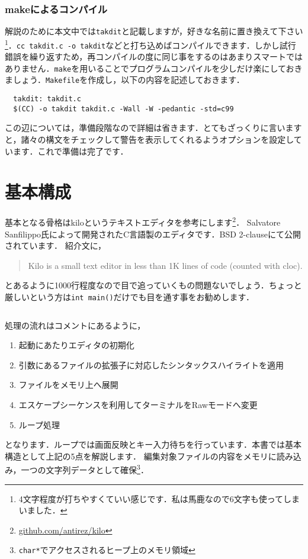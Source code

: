 \subsubsection{makeによるコンパイル}
解説のために本文中では\texttt{takdit}と記載しますが，好きな名前に置き換えて下さい\footnote{4文字程度が打ちやすくていい感じです．私は馬鹿なので6文字も使ってしまいました．}．\texttt{cc takdit.c -o takdit}などと打ち込めばコンパイルできます．しかし試行錯誤を繰り返すため，再コンパイルの度に同じ事をするのはあまりスマートではありません．\texttt{make}を用いることでプログラムコンパイルを少しだけ楽にしておきましょう．\texttt{Makefile}を作成し，以下の内容を記述しておきます．
\begin{verbatim}
  takdit: takdit.c
  $(CC) -o takdit takdit.c -Wall -W -pedantic -std=c99
\end{verbatim}
この辺については，準備段階なので詳細は省きます．とてもざっくりに言いますと，諸々の構文をチェックして警告を表示してくれるようオプションを設定しています．これで準備は完了です．

\section{基本構成}
基本となる骨格はkiloというテキストエディタを参考にします\footnote{\href{https://github.com/antirez/kilo}{github.com/antirez/kilo}}．
Salvatore Sanfilippo氏によって開発されたC言語製のエディタです．BSD 2-clauseにて公開されています．
紹介文に，
\begin{quote}
  Kilo is a small text editor in less than 1K lines of code (counted with cloc).
\end{quote}
とあるように1000行程度なので目で追っていくもの問題ないでしょう．ちょっと厳しいという方は\texttt{int main()}だけでも目を通す事をお勧めします．
\inputminted[frame=lines,framesep=2mm,baselinestretch=1.2,fontsize=\footnotesize,linenos,breaklines]{c}{takuzoo3868asset/main.c}
処理の流れはコメントにあるように，
\begin{enumerate}
  \item 起動にあたりエディタの初期化
  \item 引数にあるファイルの拡張子に対応したシンタックスハイライトを適用
  \item ファイルをメモリ上へ展開
  \item エスケープシーケンスを利用してターミナルをRawモードへ変更
  \item ループ処理
\end{enumerate}
となります．ループでは画面反映とキー入力待ちを行っています．本書では基本構造として上記の5点を解説します．
編集対象ファイルの内容をメモリに読み込み，一つの文字列データとして確保\footnote{\texttt{char*}でアクセスされるヒープ上のメモリ領域}．

